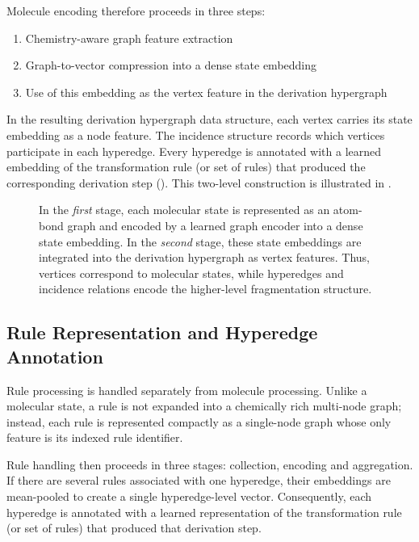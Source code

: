 Molecule encoding therefore proceeds in three steps:
\begin{enumerate}
    \item Chemistry-aware graph feature extraction
    \item Graph-to-vector compression into a dense state embedding
    \item Use of this embedding as the vertex feature in the derivation hypergraph
\end{enumerate}

In the resulting derivation hypergraph data structure, each vertex carries its state embedding as a node feature.
The incidence structure records which vertices participate in each hyperedge.
Every hyperedge is annotated with a learned embedding of the transformation rule (or set of rules) that produced the corresponding derivation step ().
This two-level construction is illustrated in .

\begin{figure}[H]
    \centering
    \resizebox{0.9\textwidth}{!}{
        
    }
    \caption[Two-Level Molecular Latent Representation]{
        In the \emph{first} stage, each molecular state  is represented as an atom-bond graph and encoded by a learned graph encoder into a dense state embedding.
        In the \emph{second} stage, these state embeddings are integrated into the derivation hypergraph as vertex features.
        Thus, vertices correspond to molecular states, while hyperedges and incidence relations encode the higher-level fragmentation structure.
    }
    \label{fig:two_level_molecular_latent_representation}
\end{figure}

\subsection{Rule Representation and Hyperedge Annotation}
\label{sec:rule-representation}

Rule processing is handled separately from molecule processing.
Unlike a molecular state, a rule is not expanded into a chemically rich multi-node graph; instead, each rule is represented compactly as a single-node graph whose only feature is its indexed rule identifier.

Rule handling then proceeds in three stages: collection, encoding and aggregation.
If there are several rules associated with one hyperedge, their embeddings are mean-pooled to create a single hyperedge-level vector.
Consequently, each hyperedge is annotated with a learned representation of the transformation rule (or set of rules) that produced that derivation step.

